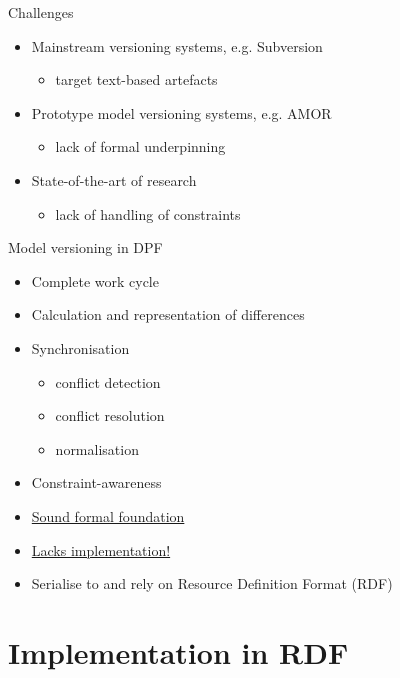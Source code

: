 \documentclass[dvips,slidetop,mathserif,brown]{beamer}
\begin{document}
\begin{frame}{Challenges}
  \begin{itemize}
    \item Mainstream versioning systems, e.g. Subversion
    \begin{itemize}
      \item target text-based artefacts
    \end{itemize}
    \pause
    \item Prototype model versioning systems, e.g. AMOR
    \begin{itemize}
      \item lack of formal underpinning
    \end{itemize}
    \pause
    \item State-of-the-art of research
    \begin{itemize}
      \item lack of handling of constraints
    \end{itemize}
  \end{itemize}
\end{frame}

\begin{frame}{Model versioning in DPF}
  \begin{itemize}
    \item Complete work cycle
    \item Calculation and representation of differences
    \item Synchronisation
    \begin{itemize}
      \item conflict detection
      \item conflict resolution
      \item normalisation
    \end{itemize}
    \item Constraint-awareness
  \end{itemize}
  \begin{itemize}
      \item \underline{Sound formal foundation}
      \item \underline{Lacks implementation!}
      \item \centering Serialise to and rely on Resource Definition Format (RDF)
  \end{itemize}
\end{frame}


\section{Implementation in RDF}
\end{document}
